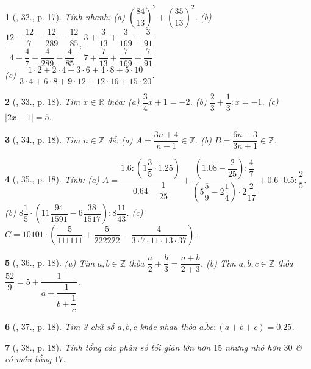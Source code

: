 \documentclass{article}
\newtheorem{baitoan}{}
\begin{document}
\begin{baitoan}[\cite{Binh_Toan_6_tap_2}, 32., p. 17]
	Tính nhanh: (a) $\left(\dfrac{84}{13}\right)^2 + \left(\dfrac{35}{13}\right)^2$. (b) $\dfrac{12 - \dfrac{12}{7} - \dfrac{12}{289} - \dfrac{12}{85}}{4 - \dfrac{4}{7} - \dfrac{4}{289} - \dfrac{4}{85}}:\dfrac{3 + \dfrac{3}{13} + \dfrac{3}{169} + \dfrac{3}{91}}{7 + \dfrac{7}{13} + \dfrac{7}{169} + \dfrac{7}{91}}$.\\(c) $\dfrac{1\cdot2 + 2\cdot4 + 3\cdot6 + 4\cdot8 + 5\cdot10}{3\cdot4 + 6\cdot8 + 9\cdot12 + 12\cdot16 + 15\cdot20}$.
\end{baitoan}

\begin{baitoan}[\cite{Binh_Toan_6_tap_2}, 33., p. 18]
	Tìm $x\in\mathbb{R}$ thỏa: (a) $\dfrac{3}{4}x + 1 = -2$. (b) $\dfrac{2}{3} + \dfrac{1}{3}:x = -1$. (c) $|2x - 1| = 5$.
\end{baitoan}

\begin{baitoan}[\cite{Binh_Toan_6_tap_2}, 34., p. 18]
	Tìm $n\in\mathbb{Z}$ để: (a) $A = \dfrac{3n + 4}{n - 1}\in\mathbb{Z}$. (b) $B = \dfrac{6n - 3}{3n + 1}\in\mathbb{Z}$.
\end{baitoan}

\begin{baitoan}[\cite{Binh_Toan_6_tap_2}, 35., p. 18]
	Tính: (a) $A = \dfrac{1.6:\left(1\dfrac{3}{5}\cdot1.25\right)}{0.64 - \dfrac{1}{25}} + \dfrac{\left(1.08 - \dfrac{2}{25}\right):\dfrac{4}{7}}{\left(5\dfrac{5}{9} - 2\dfrac{1}{4}\right)\cdot2\dfrac{2}{17}} + 0.6\cdot0.5:\dfrac{2}{5}$. (b) $8\dfrac{1}{5}\cdot\left(11\dfrac{94}{1591} - 6\dfrac{38}{1517}\right):8\dfrac{11}{43}$. (c) $C = 10101\cdot\left(\dfrac{5}{111111} + \dfrac{5}{222222} - \dfrac{4}{3\cdot7\cdot11\cdot13\cdot37}\right)$.
\end{baitoan}

\begin{baitoan}[\cite{Binh_Toan_6_tap_2}, 36., p. 18]
	(a) Tìm $a,b\in\mathbb{Z}$ thỏa $\dfrac{a}{2} + \dfrac{b}{3} = \dfrac{a + b}{2 + 3}$. (b) Tìm $a,b,c\in\mathbb{Z}$ thỏa $\dfrac{52}{9} = 5 + \dfrac{1}{a + \dfrac{1}{b + \dfrac{1}{c}}}$.
\end{baitoan}

\begin{baitoan}[\cite{Binh_Toan_6_tap_2}, 37., p. 18]
	Tìm 3 chữ số $a,b,c$ khác nhau thỏa $\overline{a.bc}:(a + b + c) = 0.25$.
\end{baitoan}

\begin{baitoan}[\cite{Binh_Toan_6_tap_2}, 38., p. 18]
	Tính tổng các phân số tối giản lớn hơn $15$ nhưng nhỏ hơn $30$ \& có mẫu bằng $17$.
\end{baitoan}
\end{document}
